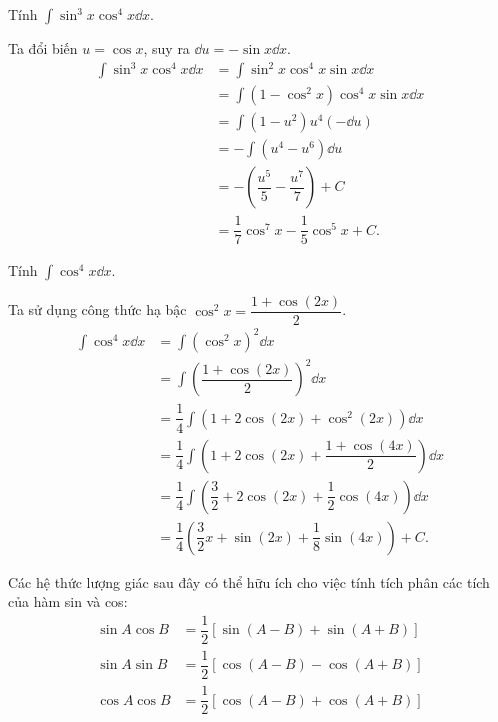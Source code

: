 \begin{example}
    Tính $\int \sin^3 x \cos^4 x \dd x$.
\end{example}
\begin{solution}
    Ta đổi biến $u = \cos x$, suy ra $\dd u = -\sin x \dd x$.
    \begin{align*}
        \int \sin^3 x \cos^4 x \dd x &= \int \sin^2 x \cos^4 x \sin x \dd x \\
        &= \int (1 - \cos^2 x) \cos^4 x \sin x \dd x \\
        &= \int (1 - u^2)u^4 (-\dd u) \\
        &= -\int (u^4 - u^6) \dd u \\
        &= -\left( \dfrac{u^5}{5} - \dfrac{u^7}{7} \right) + C \\
        &= \dfrac{1}{7}\cos^7 x - \dfrac{1}{5}\cos^5 x + C.
    \end{align*}
\end{solution}

\begin{example}
    Tính $\int \cos^4 x \dd x$.
\end{example}
\begin{solution}
    Ta sử dụng công thức hạ bậc $\cos^2 x = \dfrac{1 + \cos(2x)}{2}$.
    \begin{align*}
        \int \cos^4 x \dd x &= \int \left(\cos^2 x\right)^2 \dd x \\
        &= \int \left( \dfrac{1 + \cos(2x)}{2} \right)^2 \dd x \\
        &= \dfrac{1}{4} \int \left( 1 + 2\cos(2x) + \cos^2(2x) \right) \dd x \\
        &= \dfrac{1}{4} \int \left( 1 + 2\cos(2x) + \dfrac{1 + \cos(4x)}{2} \right) \dd x \\
        &= \dfrac{1}{4} \int \left( \dfrac{3}{2} + 2\cos(2x) + \dfrac{1}{2}\cos(4x) \right) \dd x \\
        &= \dfrac{1}{4} \left( \dfrac{3}{2}x + \sin(2x) + \dfrac{1}{8}\sin(4x) \right) + C.
    \end{align*}
\end{solution}

Các hệ thức lượng giác sau đây có thể hữu ích cho việc tính tích phân các tích của hàm sin và cos:
\begin{align*}
    \sin A \cos B &= \dfrac{1}{2}[\sin(A - B) + \sin(A + B)] \\
    \sin A \sin B &= \dfrac{1}{2}[\cos(A - B) - \cos(A + B)] \\
    \cos A \cos B &= \dfrac{1}{2}[\cos(A - B) + \cos(A + B)]
\end{align*}

